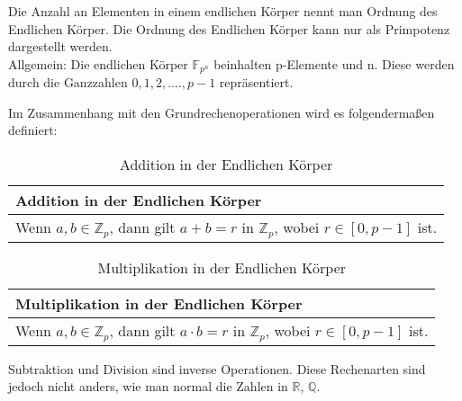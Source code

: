 Die Anzahl an Elementen in einem endlichen Körper nennt man Ordnung des Endlichen Körper. Die Ordnung des Endlichen Körper kann nur als Primpotenz dargestellt werden.\\

Allgemein: Die endlichen Körper $\mathbb{F}_{p^n}$ beinhalten p-Elemente und n. Diese werden durch die Ganzzahlen ${0,1,2,....,p-1}$ repräsentiert. 

Im Zusammenhang mit den Grundrechenoperationen wird es folgendermaßen definiert:
\begin{table}[!ht]
    \centering
        \begin{tabular}{l}
            \toprule
            \textbf{Addition in der Endlichen Körper}\\
            \midrule
            Wenn $ a, b \in \mathbb{Z}_p $, dann gilt $ a+b =r$ in $ \mathbb{Z}_p $, wobei $r \in [0, p-1]$ ist.\\
           \bottomrule
        \end{tabular}
        \caption{Addition in der Endlichen Körper}
        \label{tab3}
    \end{table}

    \begin{table}[!ht]
        \centering
            \begin{tabular}{l}
                \toprule
                \textbf{Multiplikation in der Endlichen Körper}\\
                \midrule
                Wenn $ a, b \in \mathbb{Z}_p $, dann gilt $ a \cdot b =r$ in $ \mathbb{Z}_p $, wobei $r \in [0, p-1]$ ist.\\
               \bottomrule
            \end{tabular}
            \caption{Multiplikation in der Endlichen Körper}
            \label{tab3}
        \end{table}

Subtraktion und Division sind inverse Operationen. Diese Rechenarten sind jedoch nicht anders, wie man normal die Zahlen in $\mathbb{R}$, $\mathbb{Q}$.

